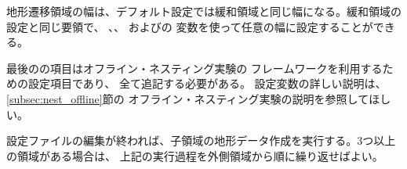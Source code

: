 地形遷移領域の幅は、デフォルト設定では緩和領域と同じ幅になる。緩和領域の設定と同じ要領で、
、、
およびの
変数を使って任意の幅に設定することができる。

最後のの項目はオフライン・ネスティング実験の
フレームワークを利用するための設定項目であり、
全て追記する必要がある。
設定変数の詳しい説明は、\ref{subsec:nest_offline}節の
オフライン・ネスティング実験の説明を参照してほしい。

設定ファイルの編集が終われば、子領域の地形データ作成を実行する。3つ以上の領域がある場合は、
上記の実行過程を外側領域から順に繰り返せばよい。



